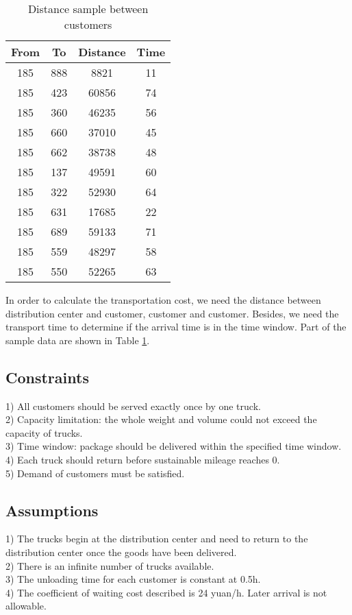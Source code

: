 \documentclass[12pt]{article}
\numberwithin{equation}{section}
\begin{document}
		\begin{table}[htbp]
  		\centering
  		\caption{Distance sample between customers}
    		\begin{tabular}{cccc}
    		\hline
    		From  & To    & Distance & Time \\
    		\hline
    		185   & 888   & 8821  & 11 \\
    		185   & 423   & 60856 & 74 \\
    		185   & 360   & 46235 & 56 \\
    		185   & 660   & 37010 & 45 \\
    		185   & 662   & 38738 & 48 \\
   		 	185   & 137   & 49591 & 60 \\
    		185   & 322   & 52930 & 64 \\
    		185   & 631   & 17685 & 22 \\
    		185   & 689   & 59133 & 71 \\
    		185   & 559   & 48297 & 58 \\
    		185   & 550   & 52265 & 63 \\
    		\hline
    		\end{tabular}%
  		\label{tab:distance}%
		\end{table}%
		
		In order to calculate the transportation cost, we need the distance between distribution center and customer, customer and customer. Besides, we need the transport time to determine if the arrival time is in the time window. Part of the sample data are shown in Table \ref{tab:distance}. 
		
		\subsection{Constraints}
1) All customers should be served exactly once by one truck.\\
2) Capacity limitation: the whole weight and volume could not exceed the capacity of trucks.\\	
3) Time window: package should be delivered within the specified time window.\\
4) Each truck should return before sustainable mileage reaches 0. \\
5) Demand of customers must be satisfied.\\

		\subsection{Assumptions}	
1) The trucks begin at the distribution center and need to return to the distribution center once the goods have been delivered. \\
2) There is an infinite number of trucks available. \\
3) The unloading time for each customer is constant at 0.5h.\\
4) The coefficient of waiting cost described is 24 yuan/h. Later arrival is not allowable.
	
\end{document}

